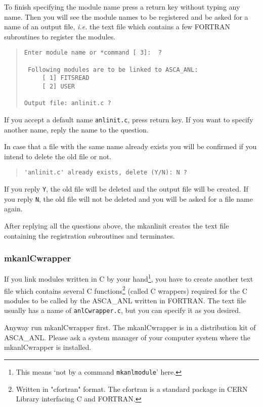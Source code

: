 To finish specifying the module name
press a return key without typing any name.
Then you will see the module names to be registered
and be asked for a name of an output file,
{\em i.e.}
the text file which contains a few FORTRAN subroutines
to register the modules.
%
\begin{quote}\baselineskip 3.2mm\begin{verbatim}
Enter module name or *command [ 3]:  ?

 Following modules are to be linked to ASCA_ANL:
     [ 1] FITSREAD
     [ 2] USER

Output file: anlinit.c ?
\end{verbatim}\end{quote}
%
If you accept a default name {\tt anlinit.c},
press return key.
If you want to specify another name,
reply the name to the question.

In case that a file with the same name already exists
you will be confirmed if you intend to delete the old file or not.
%
\begin{quote}\baselineskip 3.2mm\begin{verbatim}
'anlinit.c' already exists, delete (Y/N): N ?
\end{verbatim}\end{quote}
%
If you reply {\tt Y},
the old file will be deleted and the output file will be created.
If you reply {\tt N},
the old file will not be deleted and you will be asked for a file  
name again.

After replying all the questions above,
the mkanlinit creates the text file containing the registration  
subroutines and terminates.

\subsubsection{mkanlCwrapper}
If you link modules written in C by your hand\footnote{
This means `not by a command {\tt mkanlmodule}' here.
},
you have to create another text file
which contains several C functions\footnote{
Written in "cfortran" format.
The cfortran is a standard package in CERN Library
interfacing C and FORTRAN.
} (called C wrappers)
required for the C modules
to be called by the ASCA\_ANL written in FORTRAN.
The text file usually has a name of {\tt anlCwrapper.c},
but you can specify it as you desired.

Anyway run mkanlCwrapper first.
The mkanlCwrapper is in a distribution kit of ASCA\_ANL.
Please ask a system manager of your computer system
where the mkanlCwrapper is installed.

